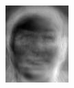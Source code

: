 \begin{frame}
\begin{columns}
\begin{overlayarea}{\textwidth}{\textheight}
{\begin{minipage}[t]{0.15\textwidth}
          \includegraphics[width=\textwidth]{images/eig_docked_image/eig_4.jpeg}
        \end{minipage}

}
\end{overlayarea}
\end{columns}
\end{frame}

